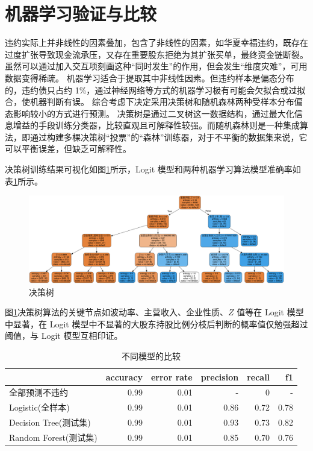 \section{机器学习验证与比较}
违约实际上并非线性的因素叠加，包含了非线性的因素，如华夏幸福违约，既存在过度扩张导致现金流承压，又存在重要股东拒绝为其扩张买单，最终资金链断裂。虽然可以通过加入交互项刻画这种“同时发生”的作用，但会发生“维度灾难”，可用数据变得稀疏。
机器学习适合于提取其中非线性因素。但违约样本是偏态分布的，违约债只占约 1\%，通过神经网络等方式的机器学习极有可能会欠拟合或过拟合，使机器判断有误。
综合考虑下决定采用决策树和随机森林两种受样本分布偏态影响较小的方式进行预测。
决策树是通过二叉树这一数据结构，通过最大化信息增益的手段训练分类器，比较直观且可解释性较强。而随机森林则是一种集成算法，即通过构建多棵决策树“投票”的“森林”训练器，对于不平衡的数据集来说，它可以平衡误差，但缺乏可解释性。

决策树训练结果可视化如图\ref{fig:decision_tree}所示，Logit 模型和两种机器学习算法模型准确率如表\ref{tab:acc}所示。

\begin{figure}[h]
	\centering
	\includegraphics[width=.9\linewidth]{./data/decision_tree.png}
	\caption{\label{fig:decision_tree}决策树}
\end{figure}

图\ref{fig:decision_tree}决策树算法的关键节点如波动率、主营收入、企业性质、\(Z\) 值等在 Logit 模型中显著，在 Logit 模型中不显著的大股东持股比例分枝后判断的概率值仅勉强超过阈值，与 Logit 模型互相印证。

\begin{table}
	\caption{\label{tab:acc}不同模型的比较}
	\centering
	\begin{tabular}{lrrrrr}
		                      & accuracy & error rate & precision & recall & f1   \\
		\hline
		全部预测不违约        & 0.99     & 0.01       & -         & 0      & -    \\
		Logistic(全样本)      & 0.99     & 0.01       & 0.86      & 0.72   & 0.78 \\
		Decision Tree(测试集) & 0.99     & 0.01       & 0.93      & 0.73   & 0.82 \\
		Random Forest(测试集) & 0.99     & 0.01       & 0.85      & 0.70   & 0.76 \\
	\end{tabular}
\end{table}

